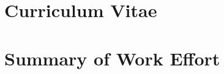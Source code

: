 \documentclass[12pt]{article}
\begin{document}


\newpage


\newpage
\section{Curriculum Vitae}
\label{sec:cv}

\newpage
\addtocounter{page}{8}
\section{Summary of Work Effort}
\label{sec:workeffort}
\end{document}
